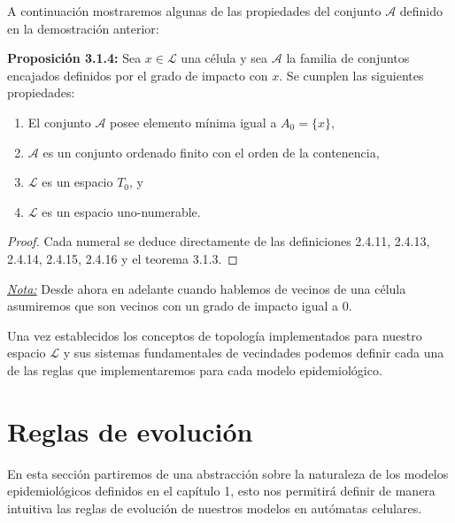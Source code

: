 A continuación mostraremos algunas de las propiedades del conjunto $\mathcal{A}$ definido en la demostración anterior:

\textbf{Proposición 3.1.4:} Sea $x\in\mathcal{L}$ una célula y sea $\mathcal{A}$ la familia de conjuntos encajados definidos por el grado de impacto con $x$. Se cumplen las siguientes propiedades:

\begin{enumerate}
    \item El conjunto $\mathcal{A}$ posee elemento mínima igual a $A_0=\{x\}$,
    \item $\mathcal{A}$ es un conjunto ordenado finito con el orden de la contenencia,
    \item $\mathcal{L}$ es un espacio $T_0$, y
    \item $\mathcal{L}$ es un espacio uno-numerable.
\end{enumerate}

\begin{proof}
Cada numeral se deduce directamente de las definiciones 2.4.11, 2.4.13, 2.4.14, 2.4.15, 2.4.16 y el teorema 3.1.3.
\end{proof}

\underline{\textit{Nota:}} Desde ahora en adelante cuando hablemos de vecinos de una célula asumiremos que son vecinos con un grado de impacto igual a 0.

Una vez establecidos los conceptos de topología implementados para nuestro espacio $\mathcal{L}$ y sus sistemas fundamentales de vecindades podemos definir cada una de las reglas que implementaremos para cada modelo epidemiológico.

\section{Reglas de evolución}

En esta sección partiremos de una abstracción sobre la naturaleza de los modelos epidemiológicos definidos en el capítulo 1, esto nos permitirá definir de manera intuitiva las reglas de evolución de nuestros modelos en autómatas celulares.


